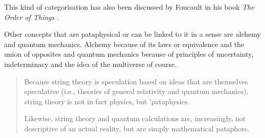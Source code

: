 This kind of categorisation has also been discussed by Foucault in his book \textit{The Order of Things} \autocite*{Foucault1966}.

\spirals

Other concepts that are pataphysical or can be linked to it in a sense are alchemy and quantum mechanics. Alchemy because of its laws or equivalence and the union of opposites \autocite{Hugill2012} and quantum mechanics because of principles of uncertainty, indeterminacy and the idea of the multiverse of course.

\begin{quotation}
  Because string theory is speculation based on ideas that are themselves speculative (i.e., theories of general relativity and quantum mechanics), string theory is not in fact physics, but 'pataphysics.

  Likewise, string theory and quantum calculations are, increasingly, not descriptive of an actual reality, but are simply mathematical pataphors. 
\end{quotation}

\stopcontents[chapters]
